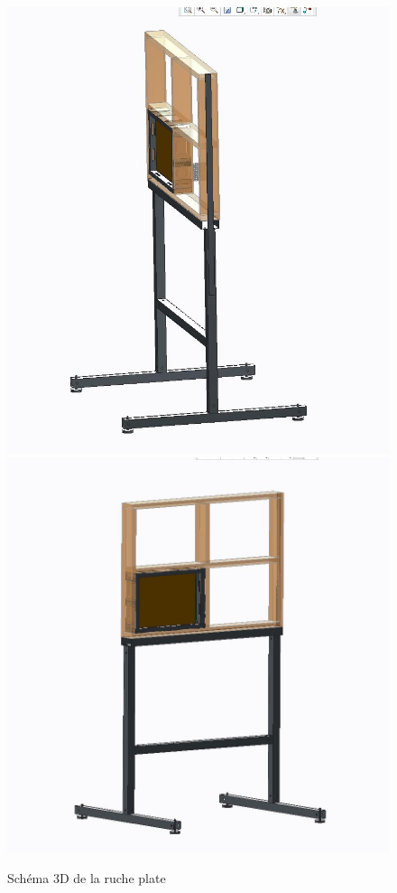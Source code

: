 \documentclass[11pt,french,a4paper]{report}
\begin{document}
\begin{figure}[!h]
\centering
\includegraphics[scale=0.3]{../images/schema_ruche/supportrucheplate1.JPG}
\includegraphics[scale=0.3]{../images/schema_ruche/supportrucheplate.JPG} 
\caption{Schéma 3D de la ruche plate}
\label{rpz_ruche}
\end{figure}
\end{document}
